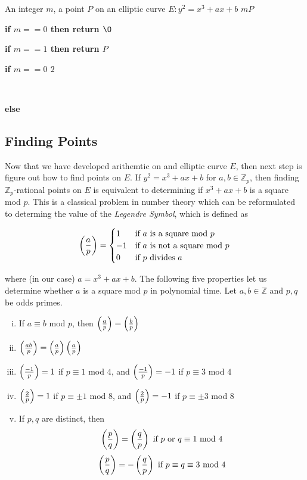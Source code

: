 	{An integer $m$, a point $P$ on an elliptic curve $E : y^2 = x^3 + ax + b $}
	{$mP$}
	{
	\item \bf{if} $m == 0$ \bf{then} return $\O$ \\
	\item \bf{if} $m == 1$ \bf{then} return $P$ \\
	\item \bf{if} $m == 0$  $2$ \\
	\item {} \\
	\item \bf{else} \\
	\item {}
	}

\subsection{Finding Points}

Now that we have developed arithemtic on and elliptic curve $E$, then next step is figure out how to find points on $E$. If $y^2 = x^3 + ax + b$ for $a,b \in \mathbb{Z}_p$, then finding $\mathbb{Z}_p$-rational points on $E$ is equivalent to determining if $x^3 + ax + b$ is a square mod $p$. This is a classical problem in number theory which can be reformulated to determing the value of the \textit{Legendre Symbol}, which is defined as 

$$ \left(\frac{a}{p}\right) =
\begin{cases}
1 &\text{if }a \text{ is a square mod } p\\
-1 &\text{if }a \text{ is not a square mod }p\\
0 & \text{if } p \text{ divides }a
\end{cases} 
$$ 

where (in our case) $a = x^3 + ax + b$. The following five properties let us determine whether $a$ is a square mod $p$ in polynomial time. Let $a,b \in \mathbb{Z}$ and $p,q$ be odds primes.

\begin{enumerate}[(i)]
	\item \label{modequiv} If $a \equiv b$ mod $p$, then $\left(\frac{a}{p}\right) = \left(\frac{b}{p}\right)$
	\item \label{multiplicative} $\left(\frac{ab}{p}\right) = \left(\frac{a}{p}\right) \left(\frac{a}{p}\right) $
	\item \label{1iseasy} $\left(\frac{-1}{p}\right) = 1$ if $p \equiv 1 $ mod $4$, and $\left(\frac{-1}{p}\right) = -1$ if $p \equiv 3 $ mod $4$
	\item \label{2iseasy} $\left(\frac{2}{p}\right) = 1$ if $p \equiv \pm 1 $ mod $8$, and $\left(\frac{2}{p}\right) = -1$ if $p \equiv \pm 3 $ mod $8$
	\item \label{reciprocity} If $p,q$ are distinct, then 
		$$ 
			\left(\frac{p}{q}\right) = \left(\frac{q}{p}\right) \text { if } p \text { or } q \equiv 1 \text{ mod } 4
		$$ 
		$$  
			\left(\frac{p}{q}\right) = - \left(\frac{q}{p}\right) \text { if } p \equiv q \equiv 3 \text{ mod } 4
		$$
\end{enumerate}


